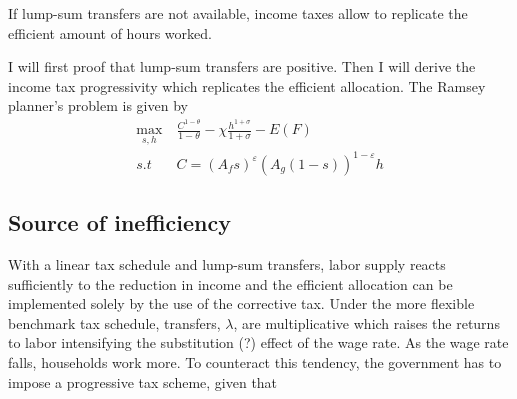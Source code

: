 \begin{prop}
	If lump-sum transfers are not available, income taxes allow to replicate the efficient amount of hours worked.
\end{prop}

I will first proof that lump-sum transfers are positive. Then I will derive the income tax progressivity which replicates the efficient allocation. 
The Ramsey planner's problem is given by
\begin{align}
\underset{s, h}{\max}\ & \frac{C^{1-\theta}}{1-\theta}-\chi \frac{h^{1+\sigma}}{1+\sigma}-E(F)\\
s.t\ \ & C=\left(A_fs\right)^{\varepsilon}\left(A_g(1-s)\right)^{1-\varepsilon}h
\end{align}

\subsection{Source of inefficiency}
With a linear tax schedule and lump-sum transfers, labor supply reacts sufficiently to the reduction in income and the efficient allocation can be implemented solely by the use of the corrective tax. Under the more flexible benchmark tax schedule, transfers, $\lambda$, are multiplicative which raises the returns to labor intensifying the substitution (?) effect of the wage rate. As the wage rate falls, households work more. To counteract this tendency, the government has to impose a progressive tax scheme, given that 


